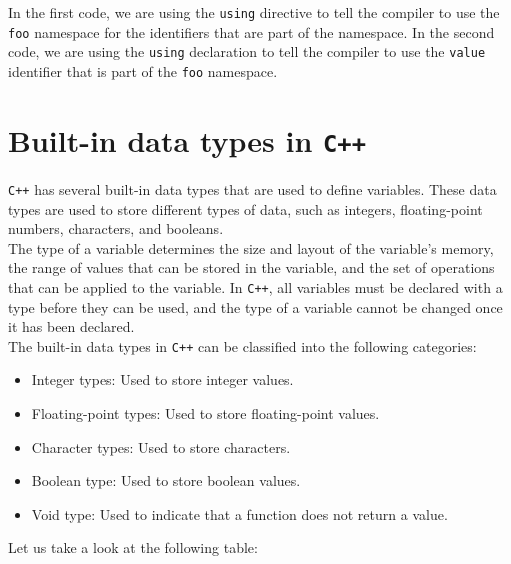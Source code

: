In the first code, we are using the \texttt{using} directive to tell the compiler to use the \texttt{foo} namespace
for the identifiers that are part of the namespace. In the second code, we are using the \texttt{using} declaration
to tell the compiler to use the \texttt{value} identifier that is part of the \texttt{foo} namespace.\\

\section{Built-in data types in \texttt{C++}}

\texttt{C++} has several built-in data types that are used to define variables. These data types are used to store
different types of data, such as integers, floating-point numbers, characters, and booleans.\\

The type of a variable determines the size and layout of the variable's memory, the range of values that can be stored
in the variable, and the set of operations that can be applied to the variable. In \texttt{C++}, all variables must be
declared with a type before they can be used, and the type of a variable cannot be changed once it has been declared.\\

The built-in data types in \texttt{C++} can be classified into the following categories:

\begin{itemize}
    \item Integer types: Used to store integer values.
    \item Floating-point types: Used to store floating-point values.
    \item Character types: Used to store characters.
    \item Boolean type: Used to store boolean values.
    \item Void type: Used to indicate that a function does not return a value.
\end{itemize}

Let us take a look at the following table:

